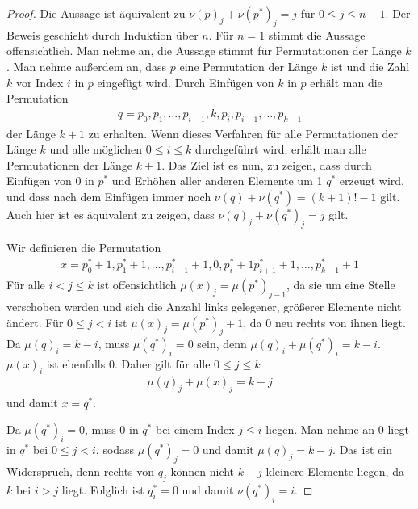 \documentclass[a4paper, 10pt, ngerman]{article}
\begin{document}
\begin{proof}
    Die Aussage ist äquivalent zu $\nu(p)_j + \nu(p^*)_j = j$ für $0 \le j \le n - 1$. Der Beweis geschieht durch Induktion über $n$. Für $n = 1$ stimmt die Aussage offensichtlich. Man nehme an, die Aussage stimmt für Permutationen der Länge $k$. Man nehme außerdem an, dass $p$ eine Permutation der Länge $k$ ist und die Zahl $k$ vor Index $i$ in $p$ eingefügt wird. Durch Einfügen von $k$ in $p$ erhält man die Permutation
    \begin{align*}
        q = p_0, p_1, \dots, p_{i - 1}, k, p_i, p_{i + 1}, \dots, p_{k - 1}
    \end{align*}
    der Länge $k + 1$ zu erhalten. Wenn dieses Verfahren für alle Permutationen der Länge $k$ und alle möglichen $0 \le i \le k$ durchgeführt wird, erhält man alle Permutationen der Länge $k + 1$. Das Ziel ist es nun, zu zeigen, dass durch Einfügen von 0 in $p^*$ und Erhöhen aller anderen Elemente um 1 $q^*$ erzeugt wird, und dass nach dem Einfügen immer noch $\nu(q) + \nu(q^*) = (k + 1)! - 1$ gilt. Auch hier ist es äquivalent zu zeigen, dass $\nu(q)_j + \nu(q^*)_j = j$ gilt.

    Wir definieren die Permutation
    \begin{align*}
        x = p^*_0 + 1, p^*_1 + 1, \dots, p^*_{i - 1} + 1, 0, p^*_i + 1 p^*_{i + 1} + 1, \dots, p^*_{k - 1} + 1
    \end{align*}
    Für alle $i < j \le k$ ist offensichtlich $\mu(x)_j = \mu(p^*)_{j - 1}$, da sie um eine Stelle verschoben werden und sich die Anzahl links gelegener, größerer Elemente nicht ändert. Für $0 \le j < i$ ist $\mu(x)_j = \mu(p^*)_j + 1$, da 0 neu rechts von ihnen liegt. Da $\mu(q)_i = k - i$, muss $\mu(q^*)_i = 0$ sein, denn $\mu(q)_i + \mu(q^*)_i = k - i$. $\mu(x)_i$ ist ebenfalls 0. Daher gilt für alle $0 \le j \le k$
    \begin{align*}
        \mu(q)_j + \mu(x)_j = k - j
    \end{align*}
    und damit $x = q^*$.
    
    Da $\mu(q^*)_i = 0$, muss 0 in $q^*$ bei einem Index $j \le i$ liegen. Man nehme an 0 liegt in $q^*$ bei $0 \le j < i$, sodass $\mu(q^*)_j = 0$ und damit $\mu(q)_j = k - j$. Das ist ein Widerspruch, denn rechts von $q_j$ können nicht $k - j$ kleinere Elemente liegen, da $k$ bei $i > j$ liegt. Folglich ist $q^*_i = 0$ und damit $\nu(q^*)_i = i$. 
    

\end{proof}
\end{document}
